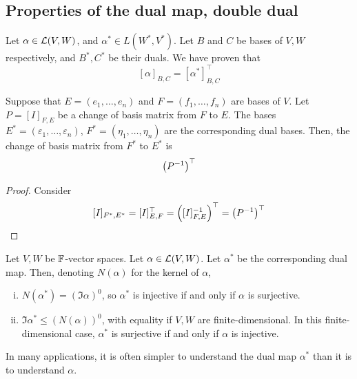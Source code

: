 \documentclass[a4paper,11pt]{article}
\begin{document}
\subsection{Properties of the dual map, double dual}

Let $ \alpha \in {\mathcal{L}}(V,W) $, and $ \alpha^* \in L(W^*, V^*) $.
Let $ B $ and $ C $ be bases of $ V, W $ respectively, and $ B^*, C^* $ be their duals.
We have proven that
\[
	[\alpha]_{B,C} = [\alpha^*]^\top_{B,C}
\]
\begin{lemma}
	Suppose that $ E = (e_1, \dots, e_n) $ and $ F = (f_1, \dots, f_n) $ are bases of $ V $.
	Let $ P = [I]_{F, E} $ be a change of basis matrix from $ F $ to $ E $.
	The bases $ E^* = (\varepsilon_1, \dots, \varepsilon_n) $, $ F^* = (\eta_1, \dots, \eta_n) $ are the corresponding dual bases.
	Then, the change of basis matrix from $ F^* $ to $ E^* $ is
	\[
		\qty(P^{-1})^\top
	\]
\end{lemma}
\begin{proof}
	Consider
	\[
		[I]_{F^*, E^*} = [I]^\top_{E, F} = \qty([I]_{F, E}^{-1})^\top = \qty(P^{-1})^\top
	\]
\end{proof}
\begin{lemma}
	Let $ V, W $ be $ {\mathbb{F}} $-vector spaces.
	Let $ \alpha \in {\mathcal{L}}(V, W) $.
	Let $ \alpha^* $ be the corresponding dual map.
	Then, denoting $ N(\alpha) $ for the kernel of $ \alpha $,
	\begin{enumerate}[(i)]
		\item $ N(\alpha^*) = (\Im \alpha)^0 $, so $ \alpha^* $ is injective if and only if $ \alpha $ is surjective.
		\item $ \Im \alpha^* \leq (N(\alpha))^0 $, with equality if $ V, W $ are finite-dimensional.
		      In this finite-dimensional case, $ \alpha^* $ is surjective if and only if $ \alpha $ is injective.
	\end{enumerate}
\end{lemma}
\begin{remark}
	In many applications, it is often simpler to understand the dual map $ \alpha^* $ than it is to understand $ \alpha $.
\end{remark}
\end{document}
